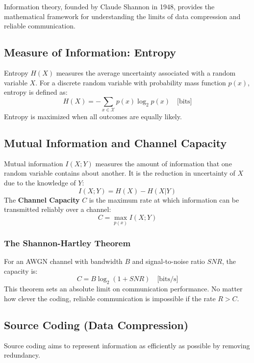 
Information theory, founded by Claude Shannon in 1948, provides the mathematical framework for understanding the limits of data compression and reliable communication.

\subsection{Measure of Information: Entropy}
Entropy $H(X)$ measures the average uncertainty associated with a random variable $X$. For a discrete random variable with probability mass function $p(x)$, entropy is defined as:
\begin{equation}
    H(X) = -\sum_{x \in \mathcal{X}} p(x) \log_2 p(x) \quad \text{[bits]}
\end{equation}
Entropy is maximized when all outcomes are equally likely.

\subsection{Mutual Information and Channel Capacity}
Mutual information $I(X; Y)$ measures the amount of information that one random variable contains about another. It is the reduction in uncertainty of $X$ due to the knowledge of $Y$:
\begin{equation}
    I(X; Y) = H(X) - H(X|Y)
\end{equation}
The \textbf{Channel Capacity} $C$ is the maximum rate at which information can be transmitted reliably over a channel:
\begin{equation}
    C = \max_{p(x)} I(X; Y)
\end{equation}

\subsubsection{The Shannon-Hartley Theorem}
For an AWGN channel with bandwidth $B$ and signal-to-noise ratio $SNR$, the capacity is:
\begin{equation}
    C = B \log_2(1 + SNR) \quad \text{[bits/s]}
\end{equation}
This theorem sets an absolute limit on communication performance. No matter how clever the coding, reliable communication is impossible if the rate $R > C$.

\subsection{Source Coding (Data Compression)}
Source coding aims to represent information as efficiently as possible by removing redundancy.

